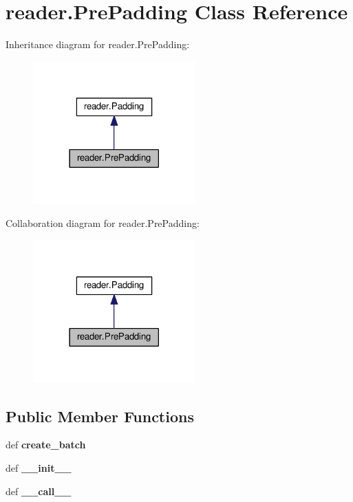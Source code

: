 \hypertarget{classreader_1_1PrePadding}{}\section{reader.\+Pre\+Padding Class Reference}
\label{classreader_1_1PrePadding}


Inheritance diagram for reader.\+Pre\+Padding\+:
\nopagebreak
\begin{figure}[H]
\begin{center}
\leavevmode
\includegraphics[width=177pt]{classreader_1_1PrePadding__inherit__graph}
\end{center}
\end{figure}


Collaboration diagram for reader.\+Pre\+Padding\+:
\nopagebreak
\begin{figure}[H]
\begin{center}
\leavevmode
\includegraphics[width=177pt]{classreader_1_1PrePadding__coll__graph}
\end{center}
\end{figure}
\subsection*{Public Member Functions}
\begin{DoxyCompactItemize}
\item 
def {\bfseries create\+\_\+batch}\hypertarget{classreader_1_1PrePadding_a7dece237533e612e7f1a456d15d8532c}{}\label{classreader_1_1PrePadding_a7dece237533e612e7f1a456d15d8532c}

\item 
def {\bfseries \+\_\+\+\_\+init\+\_\+\+\_\+}\hypertarget{classreader_1_1PrePadding_af2da1265eadcdaa00b4cb91324528107}{}\label{classreader_1_1PrePadding_af2da1265eadcdaa00b4cb91324528107}

\item 
def {\bfseries \+\_\+\+\_\+call\+\_\+\+\_\+}\hypertarget{classreader_1_1PrePadding_a7297ad9edba874636f0542b7a51a29f1}{}\label{classreader_1_1PrePadding_a7297ad9edba874636f0542b7a51a29f1}

\end{DoxyCompactItemize}
